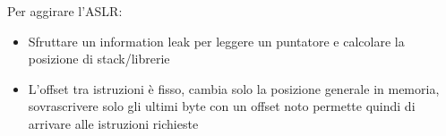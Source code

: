 Per aggirare l'ASLR: 
\begin{itemize}
    \item Sfruttare un information leak per leggere un puntatore e calcolare la posizione di stack/librerie
    
    \item L'offset tra istruzioni è fisso, cambia solo la posizione generale in memoria, sovrascrivere solo gli ultimi byte con un offset noto permette quindi di arrivare alle istruzioni richieste
\end{itemize}

